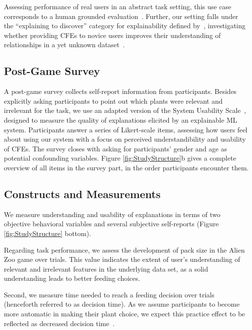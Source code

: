 Assessing performance of real users in an abstract task setting, this use case corresponds to a human grounded evaluation~\citep{doshi-velez_towards_2017}.
Further, our setting falls under the ``explaining to discover'' category for explainability defined by~\citeauthor{adadi_peeking_2018}, investigating whether providing \glspl{CFE} to novice users improves their understanding of relationships in a yet unknown dataset~\citep{adadi_peeking_2018}.

\subsection{Post-Game Survey}

A post-game survey collects self-report information from participants.
Besides explicitly asking participants to point out which plants were relevant and irrelevant for the task, we use an adapted version of the System Usability Scale~\citep{holzinger_measuring_2020}, designed to measure the quality of explanations elicited by an explainable \gls{ML} system.
Participants answer a series of Likert-scale items, assessing how users feel about using our system with a focus on perceived understandibility and usability of \glspl{CFE}.
The survey closes with asking for participants' gender and age as potential confounding variables.
Figure \ref{fig:StudyStructure}b gives a complete overview of all items in the survey part, in the order participants encounter them.

\subsection{Constructs and Measurements}

We measure understanding and usability of explanations in terms of two objective behavioral variables and several subjective self-reports (Figure \ref{fig:StudyStructure} bottom). 

Regarding task performance, we assess the development of pack size in the Alien Zoo game over trials. 
This value indicates the extent of user's understanding of relevant and irrelevant features in the underlying data set, as a solid understanding leads to better feeding choices. 

Second, we measure time needed to reach a feeding decision over trials (henceforth referred to as decision time). As we assume participants to become more automatic in making their plant choice, we expect this practice effect to be reflected as decreased decision time~\citep{logan_shapes_1992}. 


